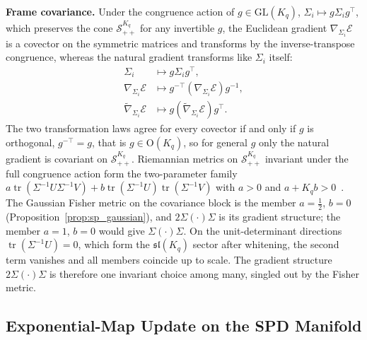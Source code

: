 \textbf{Frame covariance.} Under the congruence action of $g \in \mathrm{GL}(K_q)$, $\Sigma_i \mapsto g\Sigma_i g^\top$, which preserves the cone $\mathcal{S}_{++}^{K_q}$ for any invertible $g$, the Euclidean gradient $\nabla_{\Sigma_i}\mathcal{E}$ is a covector on the symmetric matrices and transforms by the inverse-transpose congruence, whereas the natural gradient transforms like $\Sigma_i$ itself:
\begin{align}
\Sigma_i &\mapsto g\Sigma_i g^\top, \\
\nabla_{\Sigma_i} \mathcal{E} &\mapsto g^{-\top}(\nabla_{\Sigma_i} \mathcal{E})g^{-1}, \\
\tilde{\nabla}_{\Sigma_i} \mathcal{E} &\mapsto g(\tilde{\nabla}_{\Sigma_i} \mathcal{E})g^\top.
\end{align}
The two transformation laws agree for every covector if and only if $g$ is orthogonal, $g^{-\top} = g$, that is $g \in \mathrm{O}(K_q)$, so for general $g$ only the natural gradient is covariant on $\mathcal{S}_{++}^{K_q}$. Riemannian metrics on $\mathcal{S}_{++}^{K_q}$ invariant under the full congruence action form the two-parameter family $a\operatorname{tr}(\Sigma^{-1}U\Sigma^{-1}V) + b\operatorname{tr}(\Sigma^{-1}U)\operatorname{tr}(\Sigma^{-1}V)$ with $a > 0$ and $a + K_q b > 0$~\cite{Pennec2009}. The Gaussian Fisher metric on the covariance block is the member $a = \tfrac{1}{2}$, $b = 0$ (Proposition~\ref{prop:sp_gaussian}), and $2\Sigma(\cdot)\Sigma$ is its gradient structure; the member $a = 1$, $b = 0$ would give $\Sigma(\cdot)\Sigma$. On the unit-determinant directions $\operatorname{tr}(\Sigma^{-1}U) = 0$, which form the $\mathfrak{sl}(K_q)$ sector after whitening, the second term vanishes and all members coincide up to scale. The gradient structure $2\Sigma(\cdot)\Sigma$ is therefore one invariant choice among many, singled out by the Fisher metric.

\subsection*{Exponential-Map Update on the SPD Manifold}


